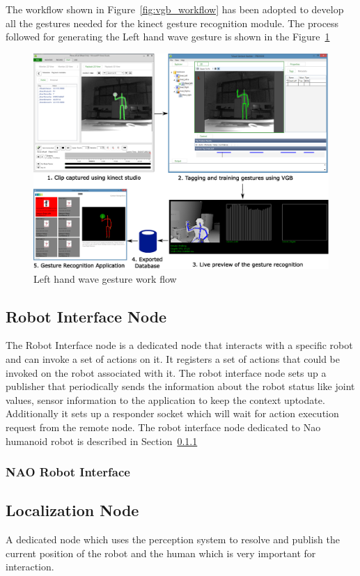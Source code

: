 The workflow shown in Figure~\ref{fig:vgb_workflow} has been adopted to develop all the gestures needed for the kinect gesture recognition module. The process followed for generating the Left hand wave gesture is shown in the Figure~\ref{fig:gesture_waveleft}
\begin{figure}
\centering
\includegraphics[width=\textwidth]{assets/gesture_recog_flow.eps}
\caption[Left hand wave gesture work flow]{Left hand wave gesture work flow}
\label{fig:gesture_waveleft}
\end{figure}
\subsection{Robot Interface Node} 
	The Robot Interface node is a dedicated node that interacts with a specific robot and can invoke a set of actions on it.  It registers a set of actions that could be invoked on the robot associated with it. The robot interface node sets up a publisher that periodically sends the information about the robot status like joint values, sensor information to the application to keep the context uptodate. Additionally it sets up a responder socket which will wait for action execution request from the remote node. The robot interface node dedicated to Nao humanoid robot is described in Section~\ref{sssec:nao_interface}
\subsubsection{NAO Robot Interface}
\label{sssec:nao_interface}
	
\subsection{Localization Node} A dedicated node which uses the perception system to resolve and publish the current position of the robot and the human which is very important for interaction.

